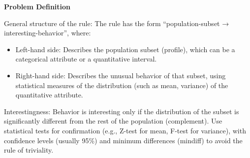 \documentclass[12pt,letterpaper, onecolumn]{exam}
\begin{document}
\begin{questions}
\begin{solution}
      
      
      
        \textbf{Problem Definition}

        General structure of the rule: The rule has the form “population-subset → interesting-behavior”, where:

        \begin{itemize}
            \item Left-hand side: Describes the population subset (profile), which can be a categorical attribute or a quantitative interval.
            \item Right-hand side: Describes the unusual behavior of that subset, using statistical measures of the distribution (such as mean, variance) of the quantitative attribute.
        \end{itemize}

        Interestingness: Behavior is interesting only if the distribution of the subset is significantly different from the rest of the population (complement). Use statistical tests for confirmation (e.g., Z-test for mean, F-test for variance), with confidence levels (usually 95\%) and minimum differences (mindiff) to avoid the rule of triviality.


\end{solution}
\end{questions}
\end{document}
